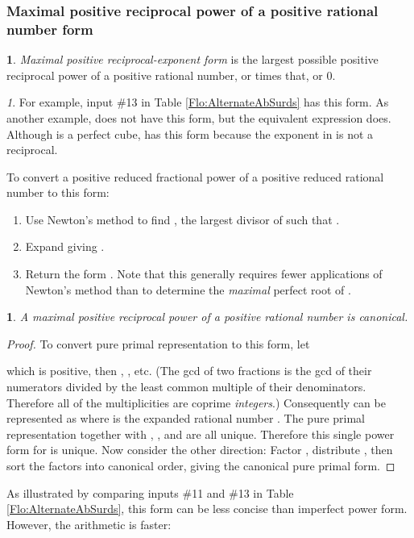 \documentclass[12pt,english]{article}
\theoremstyle{definition}
\newtheorem*{defn*}{\protect\definitionname}
\theoremstyle{remark}
\newtheorem*{rem*}{\protect\remarkname}
\theoremstyle{plain}
\theoremstyle{plain}
\newtheorem{prop}[thm]{\protect\propositionname}
\providecommand{\definitionname}{Definition}
\providecommand{\propositionname}{Proposition}
\providecommand{\remarkname}{Remark}
\begin{document}
\subsubsection{Maximal positive reciprocal power of a positive rational number form\emph{\vspace{0.3em}
}}
\begin{defn*}
\textsl{Maximal positive reciprocal-exponent form} is the largest
possible positive reciprocal power of a positive rational number,
or {\small } times that, or 0.\end{defn*}
\begin{rem*}
For example, input \#13 in Table \ref{Flo:AlternateAbSurds} has this
form. As another example,  does not have this form,
but the equivalent expression  does. Although 
is a perfect cube,  has this form because the exponent
in  is not a reciprocal.
\end{rem*}
To convert a positive reduced fractional power of a positive reduced
rational number  to this form:
\begin{enumerate}
\item Use Newton's method to find , the largest divisor of 
such that .
\item Expand  giving .
\item Return the form . Note that this generally requires
fewer applications of Newton's method than to determine the \textsl{maximal}
perfect root of .\end{enumerate}
\begin{prop}
A maximal positive reciprocal power of a positive rational number
is canonical.\end{prop}
\begin{proof}
To convert pure primal representation 
to this form, let

which is positive, then , ,
etc. (The gcd of two fractions is the gcd of their numerators divided
by the least common multiple of their denominators. Therefore all
of the multiplicities  are coprime \textsl{integers}.) Consequently
 can be represented as  where
 is the expanded rational number .
The pure primal representation together with , ,
 and  are all unique. Therefore this single power form
for  is unique. Now consider the other direction: Factor ,
distribute , then sort the factors
into canonical order, giving the canonical pure primal form.
\end{proof}
As illustrated by comparing inputs \#11 and \#13 in Table \ref{Flo:AlternateAbSurds},
this form can be less concise than imperfect power form. However,
the arithmetic is faster:
\end{document}
